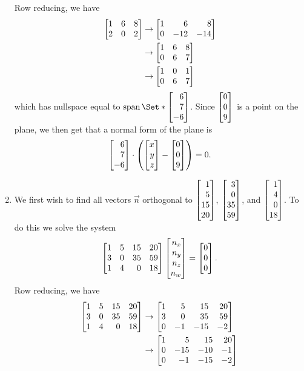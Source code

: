 \begin{exercises}
\begin{problist}
\begin{solution}
\begin{enumerate}
					Row reducing, we have 
					\begin{align*}
						\mat{1&6&8\\2&0&2}&\rightarrow \mat{1&6&8\\0&-12&-14}\\
						&\rightarrow \mat{1&6&8\\0&6&7}\\
						&\rightarrow \mat{1&0&1\\0&6&7}\\
					\end{align*}
					which has nullspace equal to $\Span\Set*{\mat{6\\7\\-6}}$.
					Since $\mat{0\\0\\9}$ is a point on the plane, we then get that a normal form of the plane is \[\mat{6\\7\\-6}\cdot \left(\mat{x\\y\\z}-\mat{0\\0\\9}\right)=0.\]
					\item We first wish to find all vectors $\vec n$ orthogonal to $\mat{1\\5\\15\\20}$, $\mat{3\\0\\35\\59}$, and $\mat{1\\4\\0\\18}$. 
						To do this we solve the system \[\mat{1&5&15&20\\3&0&35&59\\1&4&0&18}\mat{n_x\\n_y\\n_z\\n_w}=\mat{0\\0\\0}.\] 
						Row reducing, we have 
						\begin{align*}
							\mat{1&5&15&20\\3&0&35&59\\1&4&0&18}&\rightarrow \mat{1&5&15&20\\3&0&35&59\\0&-1&-15&-2}\\
							&\rightarrow \mat{1&5&15&20\\0&-15&-10&-1\\0&-1&-15&-2}\\

\end{align*}
\end{enumerate}
\end{solution}
\end{problist}
\end{exercises}
